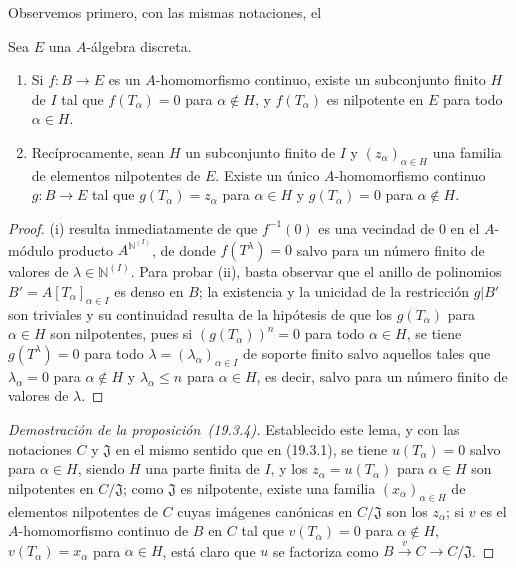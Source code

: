 Observemos primero, con las mismas notaciones, el
\begin{lemma}[19.3.4.1]
\label{0.19.3.4.1-fr}
Sea $E$ una $A$-álgebra discreta.
\begin{enumerate}
  \item[\textup{(i)}] Si $f:B\to E$ es un $A$-homomorfismo continuo, existe un
  subconjunto finito $H$ de $I$ tal que $f(T_\alpha)=0$ para $\alpha\notin H$,
  y $f(T_\alpha)$ es nilpotente en $E$ para todo $\alpha\in H$.
  
\item[\textup{(ii)}] Recíprocamente, sean $H$ un subconjunto finito de $I$ y
  $(z_\alpha)_{\alpha\in H}$ una familia de elementos nilpotentes de $E$.
  Existe un único $A$-homomorfismo continuo $g:B\to E$ tal que
  $g(T_\alpha)=z_\alpha$ para $\alpha\in H$ y
  $g(T_\alpha)=0$ para $\alpha\notin H$.
\end{enumerate}
\end{lemma}



\begin{proof}
(i) resulta inmediatamente de que $f^{-1}(0)$ es una vecindad de $0$ en el
$A$-módulo producto $A^{\mathbb{N}^{(I)}}$, de donde $f(T^\lambda)=0$ salvo para un
número finito de valores de $\lambda\in\mathbb{N}^{(I)}$. Para probar (ii),
basta observar que el anillo de polinomios
$B'=A[T_\alpha]_{\alpha\in I}$ es denso en $B$; la existencia y
la unicidad de la restricción $g|B'$ son triviales y su continuidad resulta de
la hipótesis de que los $g(T_\alpha)$ para $\alpha\in H$ son nilpotentes,
pues si $(g(T_\alpha))^n=0$ para todo $\alpha\in H$, se tiene
$g(T^\lambda)=0$ para todo $\lambda=(\lambda_\alpha)_{\alpha\in I}$ de
soporte finito salvo aquellos tales que $\lambda_\alpha=0$ para
$\alpha\notin H$ y $\lambda_\alpha\leq n$ para
$\alpha\in H$, es decir, salvo para un número finito de valores de
$\lambda$.
\end{proof}

\begin{proof}[Demostración de la proposición~{\rm(19.3.4)}]
Establecido este lema, y con las notaciones $C$ y $\mathfrak J$ en el mismo
sentido que en (19.3.1), se tiene $u(T_\alpha)=0$ salvo para
$\alpha\in H$, siendo $H$ una parte finita de $I$, y los
$z_\alpha=u(T_\alpha)$ para $\alpha\in H$ son nilpotentes en
$C/\mathfrak J$; como $\mathfrak J$ es nilpotente, existe una familia
$(x_\alpha)_{\alpha\in H}$ de elementos nilpotentes de $C$ cuyas imágenes
canónicas en $C/\mathfrak J$ son los $z_\alpha$; si $v$ es el
$A$-homomorfismo continuo de $B$ en $C$ tal que
$v(T_\alpha)=0$ para $\alpha\notin H$, $v(T_\alpha)=x_\alpha$ para
$\alpha\in H$, está claro que $u$ se factoriza como
$B\xrightarrow{v}C\to C/\mathfrak J$.
\end{proof}

